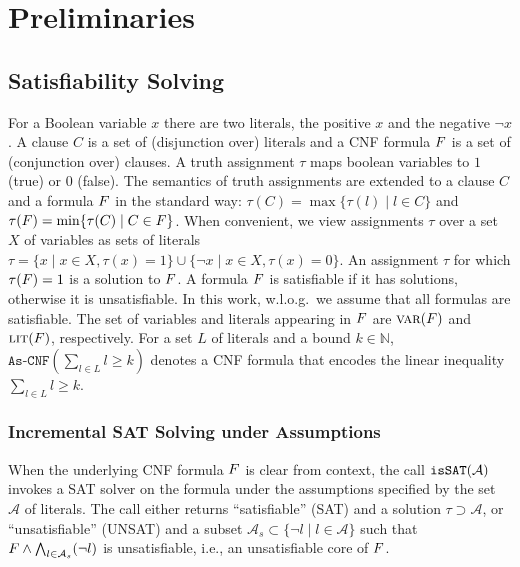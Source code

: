 \chapter{Preliminaries\label{chap:preliminaries}}


\section{Satisfiability Solving\label{sec:sat}}

For a Boolean variable $x$ there are two literals, the positive $x$ and the negative $\lnot x$. 
A clause $C$ is a set of (disjunction over) literals and a CNF formula $F$ is a set of (conjunction over) clauses.
A truth assignment $\tau$  maps boolean variables to $1$ (true) or $0$ (false).
The semantics of truth assignments are extended to a clause $C$ and a formula $F$ in the standard way: $\tau(C) = \max\{ \tau(l) \mid l \in C\}$ and $\tau(F) = \min\{\tau(C) \mid C \in F\}$.
When convenient, we view assignments $\tau$ over a set $X$ of variables as sets of literals $\tau = \{ x \mid x \in X,  \tau(x) = 1\} \cup \{ \lnot x \mid x \in X, \tau(x) = 0\}$.
An assignment $\tau$ for which $\tau(F) = 1$ is a solution to $F$.
A formula $F$ is satisfiable if it has solutions, otherwise it is unsatisfiable. 
In this work, w.l.o.g.\ we assume that all formulas are satisfiable.
The set of variables and literals appearing in $F$ are $\textsc{var}(F)$ and $\textsc{lit}(F)$, respectively.  
For a set $L$ of literals and a bound $k \in \mathbb{N}$, $\texttt{As-CNF}\left(\sum_{l \in L} l \geq k\right)$ denotes a CNF formula that encodes the linear inequality $\sum_{l \in L} l \geq k$. %

\subsection{Incremental SAT Solving under Assumptions\label{sec:inc-sat}}


When the underlying CNF formula $F$ is clear from context, the call $\texttt{isSAT}(\mathcal{A})$ invokes a SAT solver on the formula under the assumptions specified by the set $\mathcal{A}$ of literals.
The call either returns ``satisfiable'' (SAT) and a solution $\tau \supset \mathcal{A}$, or ``unsatisfiable'' (UNSAT) and a subset $\mathcal{A}_s \subset \{\lnot l \mid l\in\mathcal{A}\}$ such that $F \land \bigwedge_{l \in \mathcal{A}_s} (\lnot l)$ is unsatisfiable, i.e., an unsatisfiable core of $F$.

